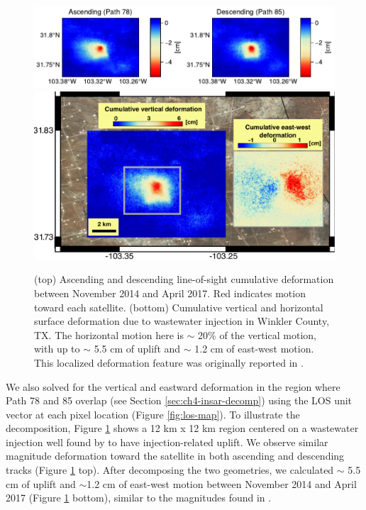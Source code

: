 \begin{figure}
	\centering
	\includegraphics[width=.8\textwidth]{figures/chapter2-sar/injection-asc-desc.pdf}
	\includegraphics[width=.72\textwidth]{figures/chapter2-sar/injection-kim-lu}
	\caption[Vertical and horizontal deformation near Winkler County, TX]{
		(top) Ascending and descending line-of-sight cumulative deformation between November 2014 and April 2017. Red indicates motion toward each satellite.
		(bottom) Cumulative vertical and horizontal surface deformation due to wastewater injection in Winkler County, TX. The horizontal motion here is $\sim$ 20\% of the vertical motion, with up to $\sim$ 5.5 cm of uplift and $\sim$ 1.2 cm of east-west motion. This localized deformation feature was originally reported in \cite{Kim2018AssociationLocalizedGeohazards}.}
	\label{fig:ch2-injection-kim-lu}
\end{figure}


We also solved for the vertical and eastward deformation in the region where Path 78 and 85 overlap (see Section \ref{sec:ch4-insar-decomp}) using the LOS unit vector at each pixel location (Figure \ref{fig:los-map}).
To illustrate the decomposition, Figure \ref{fig:ch2-injection-kim-lu} shows a 12 km x 12 km region centered on a wastewater injection well found by \cite{Kim2018AssociationLocalizedGeohazards} to have injection-related uplift. We observe similar magnitude deformation toward the satellite in both ascending and descending tracks (Figure \ref{fig:ch2-injection-kim-lu} top). 
After decomposing the two geometries, we calculated $\sim$ 5.5 cm of uplift and $\sim$1.2 cm of east-west motion between November 2014 and April 2017 (Figure \ref{fig:ch2-injection-kim-lu} bottom), similar to the magnitudes found in \cite{Kim2018AssociationLocalizedGeohazards}.

